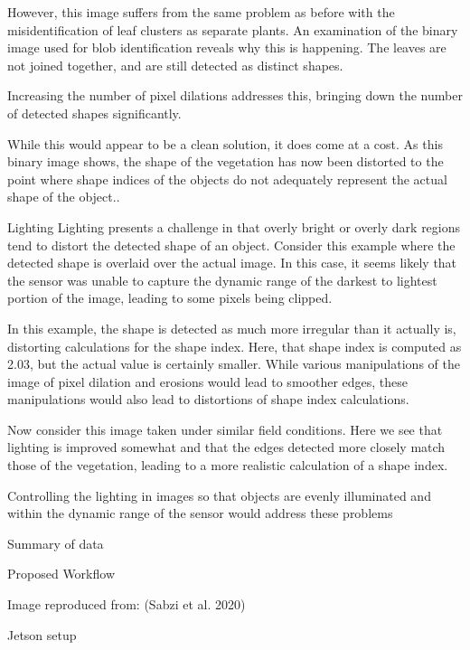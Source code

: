 \documentclass[letterpaper]{article}
\begin{document}
However, this image suffers from the same problem as before with the misidentification of leaf clusters as separate plants.  An examination of the binary image used for blob identification reveals why this is happening.   The leaves are not joined together, and are still detected as distinct shapes.




Increasing the number of pixel dilations addresses this, bringing down the number of detected shapes significantly.


While this would appear to be a clean solution, it does come at a cost. As this binary image shows, the shape of the vegetation has now been distorted to the point where shape indices of the objects do not adequately represent the actual shape of the object..



Lighting
Lighting presents a challenge in that overly bright or overly dark regions tend to distort the detected shape of an object. Consider this example where the detected shape is overlaid over the actual image. In this case, it seems likely that the sensor was unable to capture the dynamic range of the darkest to lightest portion of the image, leading to some pixels being clipped.



In this example, the shape is detected as much more irregular than it actually is, distorting calculations for the shape index. Here, that shape index is computed as 2.03, but the actual value is certainly smaller. While various manipulations of the image of pixel dilation and erosions would lead to smoother edges, these manipulations would also lead to distortions of shape index calculations.

Now consider this image taken under similar field conditions.  Here we see that lighting is improved somewhat and that the edges detected more closely match those of the vegetation, leading to a more realistic calculation of a shape index. 


Controlling the lighting in images so that objects are evenly illuminated and within the dynamic range of the sensor would address these problems

Summary of data

Proposed Workflow


Image reproduced from: (Sabzi et al. 2020)




Jetson setup

%
%
%
\end{document}
